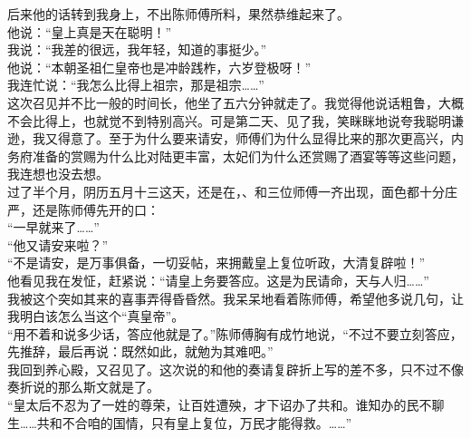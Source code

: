 后来他的话转到我身上，不出陈师傅所料，果然恭维起来了。\\

他说：“皇上真是天在聪明！”\\

我说：“我差的很远，我年轻，知道的事挺少。”\\

他说：“本朝圣祖仁皇帝也是冲龄践柞，六岁登极呀！”\\

我连忙说：“我怎么比得上祖宗，那是祖宗……”\\

这次召见并不比一般的时间长，他坐了五六分钟就走了。我觉得他说话粗鲁，大概不会比得上，也就觉不到特别高兴。可是第二天、见了我，笑眯眯地说夸我聪明谦逊，我又得意了。至于为什么要来请安，师傅们为什么显得比来的那次更高兴，内务府准备的赏赐为什么比对陆更丰富，太妃们为什么还赏赐了酒宴等等这些问题，我连想也没去想。\\

过了半个月，阴历五月十三这天，还是在，、和三位师傅一齐出现，面色都十分庄严，还是陈师傅先开的口：\\

“一早就来了……”\\

“他又请安来啦？”\\

“不是请安，是万事俱备，一切妥帖，来拥戴皇上复位听政，大清复辟啦！”\\

他看见我在发怔，赶紧说：“请皇上务要答应。这是为民请命，天与人归……”\\

我被这个突如其来的喜事弄得昏昏然。我呆呆地看着陈师傅，希望他多说几句，让我明白该怎么当这个“真皇帝”。\\

“用不着和说多少话，答应他就是了。”陈师傅胸有成竹地说，“不过不要立刻答应，先推辞，最后再说：既然如此，就勉为其难吧。”\\

我回到养心殿，又召见了。这次说的和他的奏请复辟折上写的差不多，只不过不像奏折说的那么斯文就是了。\\

“皇太后不忍为了一姓的尊荣，让百姓遭殃，才下诏办了共和。谁知办的民不聊生……共和不合咱的国情，只有皇上复位，万民才能得救。……”\\


